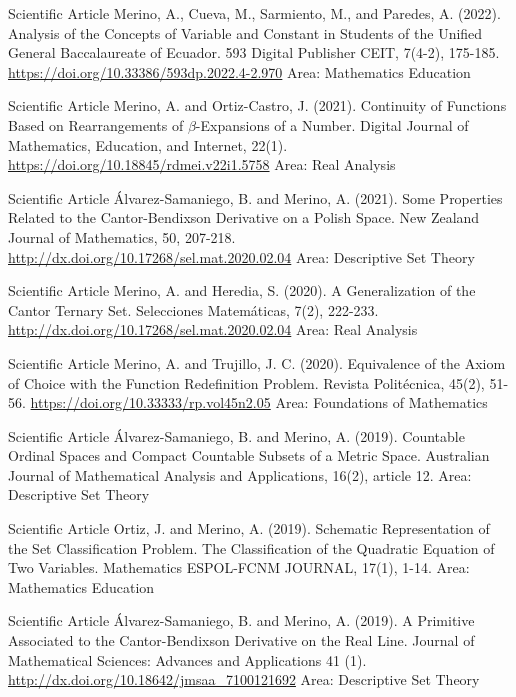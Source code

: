 \documentclass[
    a4paper,
    maincolor=cvblue!70!blue,
    sidecolor=gray!30,
    sectioncolor=cvblue!70!blue,
    sidebarwidth=7.5cm,
    topbottommargin=20pt,
    leftrightmargin=20pt,
]{fortysecondscv}
\begin{document}
    {Scientific Article}
    {Merino, A., Cueva, M., Sarmiento, M., and Paredes, A. (2022). Analysis of the Concepts of Variable and Constant in Students of the Unified General Baccalaureate of Ecuador. 593 Digital Publisher CEIT, 7(4-2), 175-185.}     
    {\url{https://doi.org/10.33386/593dp.2022.4-2.970}}
    {Area: Mathematics Education}
    
    {Scientific Article}
    {Merino, A. and Ortiz-Castro, J. (2021). Continuity of Functions Based on Rearrangements of $\beta$-Expansions of a Number. Digital Journal of Mathematics, Education, and Internet, 22(1).}     
    {\url{https://doi.org/10.18845/rdmei.v22i1.5758}}
    {Area: Real Analysis}
    
    {Scientific Article}
    {Álvarez-Samaniego, B. and Merino, A. (2021). Some Properties Related to the Cantor-Bendixson Derivative on a Polish Space. New Zealand Journal of Mathematics, 50, 207-218.}     {\url{http://dx.doi.org/10.17268/sel.mat.2020.02.04}}
    {Area: Descriptive Set Theory}
    
    {Scientific Article}
    {Merino, A. and Heredia, S. (2020). A Generalization of the Cantor Ternary Set. Selecciones Matemáticas, 7(2), 222-233.}     {\url{http://dx.doi.org/10.17268/sel.mat.2020.02.04}}
    {Area: Real Analysis}
    
    {Scientific Article}
    {Merino, A. and Trujillo, J. C. (2020). Equivalence of the Axiom of Choice with the Function Redefinition Problem. Revista Politécnica, 45(2), 51-56.}     
    {\url{https://doi.org/10.33333/rp.vol45n2.05}}
    {Area: Foundations of Mathematics}
    
    {Scientific Article}
    {Álvarez-Samaniego, B. and Merino, A. (2019). Countable Ordinal Spaces and Compact Countable Subsets of a Metric Space. Australian Journal of Mathematical Analysis and Applications, 16(2), article 12.}
    {}
    {Area: Descriptive Set Theory}
    
    {Scientific Article}
    {Ortiz, J. and Merino, A. (2019). Schematic Representation of the Set Classification Problem. The Classification of the Quadratic Equation of Two Variables. Mathematics ESPOL-FCNM JOURNAL, 17(1), 1-14.}
    {}
    {Area: Mathematics Education}
    
    {Scientific Article}
    {Álvarez-Samaniego, B. and Merino, A. (2019). A Primitive Associated to the Cantor-Bendixson Derivative on the Real Line. Journal of Mathematical Sciences: Advances and Applications 41 (1).}     
    {\url{http://dx.doi.org/10.18642/jmsaa_7100121692}}
    {Area: Descriptive Set Theory}
    
\end{document}
